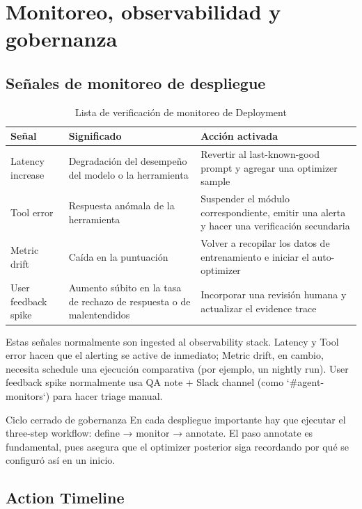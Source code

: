 \section{Monitoreo, observabilidad y gobernanza}

\subsection{Señales de monitoreo de despliegue}

\begin{table}[H]
\centering
\caption{Lista de verificación de monitoreo de Deployment}
\begin{tabular}{p{}p{}p{}}
\toprule
Señal & Significado & Acción activada \\
\midrule
Latency increase & Degradación del desempeño del modelo o la herramienta & Revertir al last-known-good prompt y agregar una optimizer sample \\
Tool error & Respuesta anómala de la herramienta & Suspender el módulo correspondiente, emitir una alerta y hacer una verificación secundaria \\
Metric drift & Caída en la puntuación & Volver a recopilar los datos de entrenamiento e iniciar el auto-optimizer \\
User feedback spike & Aumento súbito en la tasa de rechazo de respuesta o de malentendidos & Incorporar una revisión humana y actualizar el evidence trace \\
\bottomrule
\end{tabular}
\end{table}

Estas señales normalmente son ingested al observability stack. Latency y Tool error hacen que el alerting se active de inmediato; Metric drift, en cambio, necesita schedule una ejecución comparativa (por ejemplo, un nightly run). User feedback spike normalmente usa QA note + Slack channel (como `\#agent-monitors`) para hacer triage manual.

\begin{warningbox}{Ciclo cerrado de gobernanza}
En cada despliegue importante hay que ejecutar el three-step workflow: define → monitor → annotate. El paso annotate es fundamental, pues asegura que el optimizer posterior siga recordando por qué se configuró así en un inicio.
\end{warningbox}

\subsection{Action Timeline}

